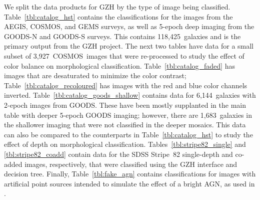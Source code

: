 \documentclass[twocolumn]{aastex6}
\begin{document}
We split the data products for GZH by the type of image being classified. Table~\ref{tbl:catalog_hst} contains the classifications for the \hst{} images from the AEGIS, COSMOS, and GEMS surveys, as well as 5-epoch deep imaging from the GOODS-N and GOODS-S surveys. This contains 118,425~galaxies and is the primary output from the GZH project. The next two tables have data for a small subset of 3,927~COSMOS~images that were re-processed to study the effect of color balance on morphological classification. Table~\ref{tbl:catalog_faded} has images that are desaturated to minimize the color contrast; Table~\ref{tbl:catalog_recoloured} has images with the red and blue color channels inverted. Table~\ref{tbl:catalog_goods_shallow} contains data for 6,144~galaxies with 2-epoch images from GOODS. These have been mostly supplanted in the main table with deeper 5-epoch GOODS imaging; however, there are 1,683~galaxies in the shallower imaging that were not classified in the deeper mosaics. This data can also be compared to the counterparts in Table~\ref{tbl:catalog_hst} to study the effect of depth on morphological classification. Tables~\ref{tbl:stripe82_single} and \ref{tbl:stripe82_coadd} contain data for the SDSS Stripe~82 single-depth and co-added images, respectively, that were classified using the GZH interface and decision tree. Finally, Table~\ref{tbl:fake_agn} contains classifications for images with artificial point sources intended to simulate the effect of a bright AGN, as used in \citet{sim14}.  
\end{document}
